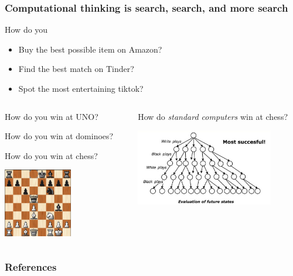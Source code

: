 \documentclass[xcolor=x11names]{beamer}
\begin{document}
\begin{frame}
\frametitle{Computational thinking is search, search, and more search}
\pause

How do \alert{you}
\begin{itemize}
 \item Buy the best possible item on Amazon?
 \item Find the best match on Tinder?
 \item Spot the most entertaining tiktok?
\end{itemize}						\pause
\bigskip

\begin{columns}
\begin{column}{0.45\textwidth}
How do \alert{you} win at UNO?		\pause
\bigskip

How do \alert{you} win at dominoes?		\pause
\bigskip

How do \alert{you} win at chess?

\centering
\includegraphics[width=30mm]{img/chess.png}
\end{column}							\pause

\begin{column}{0.5\textwidth}
How do \textit{standard \alert{computers}} win at chess?
\bigskip								\pause

\centering
\includegraphics[width=60mm]{img/chess_brute.png}
\bigskip
\end{column}
\end{columns}
\end{frame}



\begin{frame}[allowframebreaks]
\frametitle{References}


\end{frame}
\end{document}
